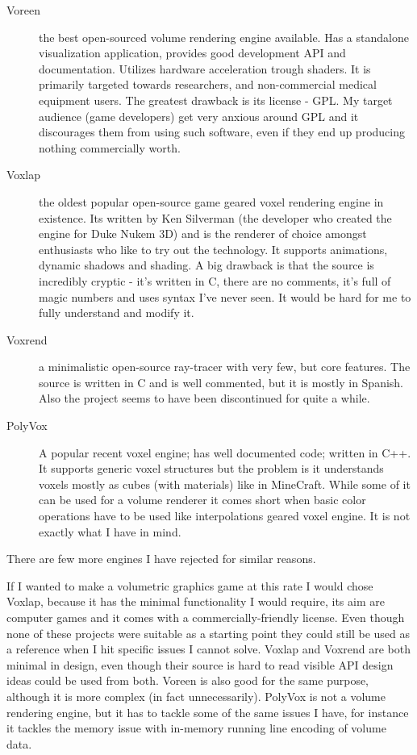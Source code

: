 \documentclass[11pt,fleqn,twoside]{article}
\begin{document}
\begin{description}
	\item[Voreen\cite{Volreen}]
	the best open-sourced volume rendering engine available. Has a standalone visualization application, provides good development API and documentation. Utilizes hardware acceleration trough shaders. It is primarily targeted towards researchers, and non-commercial medical equipment users. The greatest drawback is its license - GPL. My target audience (game developers) get very anxious around GPL and it discourages them from using such software, even if they end up producing nothing commercially worth.
	\item[Voxlap\cite{Voxlap}]
	the oldest popular open-source game geared voxel rendering engine in existence. Its written by Ken Silverman (the developer who created the engine for Duke Nukem 3D) and is the renderer of choice amongst enthusiasts who like to try out the technology. It supports animations, dynamic shadows and shading. A big drawback is that the source is incredibly cryptic - it's written in C, there are no comments, it's full of magic numbers and uses syntax I've never seen. It would be hard for me to fully understand and modify it.
	\item[Voxrend\cite{VoxRend}]
	a minimalistic open-source ray-tracer with very few, but core features. The source is written in C and is well commented, but it is mostly in Spanish. Also the project seems to have been discontinued for quite a while.
	\item[PolyVox\cite{PolyVox}]
	A popular recent voxel engine; has well documented code; written in C++. It supports generic voxel structures but the problem is it understands voxels mostly as cubes (with materials) like in MineCraft. While some of it can be used for a volume renderer it comes short when basic color operations have to be used like interpolations geared voxel engine. It is not exactly what I have in mind.
\end{description}

There are few more engines I have rejected for similar reasons.

If I wanted to make a volumetric graphics game at this rate I would chose Voxlap, because it has the minimal functionality I would require, its aim are computer games and it comes with a commercially-friendly license. Even though none of these projects were suitable as a starting point they could still be used as a reference when I hit specific issues I cannot solve. Voxlap and Voxrend are both minimal in design, even though their source is hard to read visible API design ideas could be used from both. Voreen is also good for the same purpose, although it is more complex (in fact unnecessarily). PolyVox is not a volume rendering engine, but it has to tackle some of the same issues I have, for instance it tackles the memory issue with in-memory running line encoding of volume data.
\end{document}
